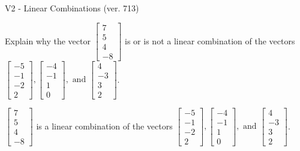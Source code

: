 \begin{exercise}
  \begin{exerciseTitle}V2 - Linear Combinations (ver. 713)\end{exerciseTitle}
  \begin{exerciseStatement}
    Explain why the vector \(\left[\begin{array}{c}
7 \\
5 \\
4 \\
-8
\end{array}\right]\)  is or is not a linear 
	combination of the vectors \(\left[\begin{array}{c}
-5 \\
-1 \\
-2 \\
2
\end{array}\right] , \left[\begin{array}{c}
-4 \\
-1 \\
1 \\
0
\end{array}\right] , \text{ and } \left[\begin{array}{c}
4 \\
-3 \\
3 \\
2
\end{array}\right]\).
	


  \end{exerciseStatement}
  \begin{exerciseAnswer}
   \(\left[\begin{array}{c}
7 \\
5 \\
4 \\
-8
\end{array}\right]\) 
  	 is  
	a linear combination of the vectors \(\left[\begin{array}{c}
-5 \\
-1 \\
-2 \\
2
\end{array}\right] , \left[\begin{array}{c}
-4 \\
-1 \\
1 \\
0
\end{array}\right] , \text{ and } \left[\begin{array}{c}
4 \\
-3 \\
3 \\
2
\end{array}\right]\).

	
  


  \end{exerciseAnswer}
\end{exercise}